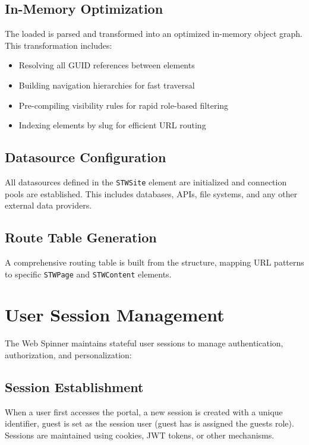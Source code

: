 \subsection{In-Memory Optimization}

The loaded \webbase{} is parsed and transformed into an optimized in-memory object graph. This transformation includes:

\begin{itemize}
    \item Resolving all GUID references between elements
    \item Building navigation hierarchies for fast traversal
    \item Pre-compiling visibility rules for rapid role-based filtering
    \item Indexing elements by slug for efficient URL routing
\end{itemize}

\subsection{Datasource Configuration}

All datasources defined in the \texttt{STWSite} element are initialized and connection pools are established. This includes databases, \rest{} APIs, file systems, and any other external data providers.

\subsection{Route Table Generation}

A comprehensive routing table is built from the \webbase{} structure, mapping URL patterns to specific \texttt{STWPage} and \texttt{STWContent} elements.

\section{User Session Management}
\label{sec:session-management}

The Web Spinner maintains stateful user sessions to manage authentication, authorization, and personalization:

\subsection{Session Establishment}

When a user first accesses the portal, a new session is created with a unique identifier, guest is set as the session user (guest has is assigned the guests role). Sessions are maintained using cookies, JWT tokens, or other mechanisms.

